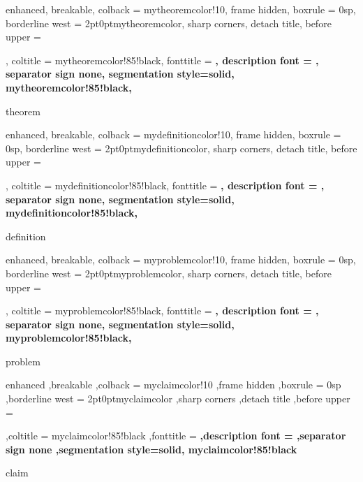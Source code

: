 {%
    enhanced,
    breakable,
    colback = mytheoremcolor!10,
    frame hidden,
    boxrule = 0sp,
    borderline west = {2pt}{0pt}{mytheoremcolor},
    sharp corners,
    detach title,
    before upper = \tcbtitle\par\smallskip,
    coltitle = mytheoremcolor!85!black,
    fonttitle = \bfseries\sffamily,
    description font = \mdseries,
    separator sign none,
    segmentation style={solid, mytheoremcolor!85!black},
}
{theorem}

\newenvironment{theorem}[2][]{%
    \begin{Theorem}{#2}{#1}%
    }{%
    \end{Theorem}%
}

{%
    enhanced,
    breakable,
    colback = mydefinitioncolor!10,
    frame hidden,
    boxrule = 0sp,
    borderline west = {2pt}{0pt}{mydefinitioncolor},
    sharp corners,
    detach title,
    before upper = \tcbtitle\par\smallskip,
    coltitle = mydefinitioncolor!85!black,
    fonttitle = \bfseries\sffamily,
    description font = \mdseries,
    separator sign none,
    segmentation style={solid, mydefinitioncolor!85!black},
}
{definition}

\newenvironment{definition}[2][]{%
    \begin{Definition}{#2}{#1}%
    }{%
    \end{Definition}%
}

{%
    enhanced,
    breakable,
    colback = myproblemcolor!10,
    frame hidden,
    boxrule = 0sp,
    borderline west = {2pt}{0pt}{myproblemcolor},
    sharp corners,
    detach title,
    before upper = \tcbtitle\par\smallskip,
    coltitle = myproblemcolor!85!black,
    fonttitle = \bfseries\sffamily,
    description font = \mdseries,
    separator sign none,
    segmentation style={solid, myproblemcolor!85!black},
}
{problem}

\newenvironment{problem}[2][]{%
    \begin{Problem}{#2}{#1}%
    }{%
    \end{Problem}%
}
{%
    enhanced
    ,breakable
    ,colback = myclaimcolor!10
    ,frame hidden
    ,boxrule = 0sp
    ,borderline west = {2pt}{0pt}{myclaimcolor}
    ,sharp corners
    ,detach title
    ,before upper = \tcbtitle\par\smallskip
    ,coltitle = myclaimcolor!85!black
    ,fonttitle = \bfseries\sffamily
    ,description font = \mdseries
    ,separator sign none
    ,segmentation style={solid, myclaimcolor!85!black}
}
{claim}

